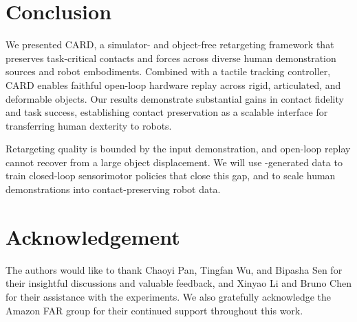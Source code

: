 
\section{Conclusion}
\label{sec:conclusion}

We presented CARD, a simulator- and object-free retargeting framework that preserves task-critical contacts and forces across diverse human demonstration sources and robot embodiments. Combined with a tactile tracking controller, CARD enables faithful open-loop hardware replay across rigid, articulated, and deformable objects. Our results demonstrate substantial gains in contact fidelity and task success, establishing contact preservation as a scalable interface for transferring human dexterity to robots.


 Retargeting quality is bounded by the input demonstration, and open-loop replay cannot recover from a large object displacement. We will use \ours-generated data to train closed-loop sensorimotor policies that close this gap, and to scale human demonstrations into contact-preserving robot data.


\section{Acknowledgement}
The authors would like to thank Chaoyi Pan, Tingfan Wu, and Bipasha Sen for their insightful discussions and valuable feedback, and Xinyao Li and Bruno Chen for their assistance with the experiments. We also gratefully acknowledge the Amazon FAR group for their continued support throughout this work.


\label{sec:conclusion}
